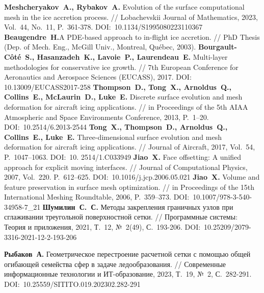 \begin{thebibliography}{99}
%
\textbf{Meshcheryakov~A., Rybakov~A.} Evolution of the surface computational mesh in the ice accretion process. // Lobachevskii Journal of Mathematics, 2023, Vol.~44, No.~11, P.~361-378. DOI:~10.1134/S1995080223110367
%
\textbf{Beaugendre~H.}A PDE-based approach to in-flight ice accretion. // PhD Thesis (Dep. of Mech. Eng., McGill Univ., Montreal, Qu{\'e}bec, 2003).
%
\textbf{Bourgault-Côté~S., Hasanzadeh~K., Lavoie~P., Laurendeau~E.} Multi-layer methodologies for conservative ice growth. // 7th European Conference for Aeronautics and Aerospace Sciences (EUCASS), 2017. DOI: 10.13009/EUCASS2017-258
%
\textbf{Thompson~D., Tong~X., Arnoldus~Q., Collins~E., McLaurin~D., Luke~E.} Discrete surface evolution and mesh deformation for aircraft icing applications. // in Proceedings of the 5th AIAA Atmospheric and Space Environments Conference, 2013, P.~1–20. DOI:~10.2514/6.2013-2544
%
\textbf{Tong~X., Thompson~D., Arnoldus~Q., Collins~E., Luke~E.} Three-dimensional surface evolution and mesh deformation for aircraft icing applications. // Journal of Aircraft, 2017, Vol.~54, P.~1047–1063. DOI:~10.
2514/1.C033949
%
\textbf{Jiao~X.} Face offsetting: A unified approach for explicit moving interfaces. // Journal of Computational Physics, 2007, Vol.~220. P.~612–625. DOI:~10.1016/j.jcp.2006.05.021
%
\textbf{Jiao~X.} Volume and feature preservation in surface mesh optimization. // in Proceedings of the 15th International Meshing Roundtable, 2006, P.~359–373. DOI:~10.1007/978-3-540-34958-7\_21
%
\textbf{Шумилин~С.~С.} Методы закрепления граничных узлов при сглаживании треугольной поверхностной сетки. // Программные системы: Теория и приложения, 2021, Т.~12, №~2(49), С.~193-206. DOI:~10.25209/2079-3316-2021-12-2-193-206
%



%
\textbf{Рыбаков~А.} Геометрическое перестроение расчетной сетки с помощью общей огибающей семейства сфер в задаче ледообразования. // Современные информационные технологии и ИТ-образование, 2023, Т.~19, №~2, С.~282-291. DOI:~10.25559/SITITO.019.202302.282-291
%




\end{thebibliography}
